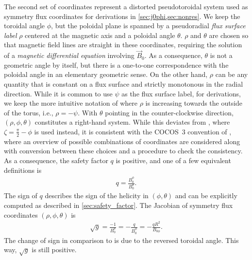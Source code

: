 The second set of coordinates represent a distorted pseudotoroidal system used as symmetry flux coordinates for derivations in \cref{sec:j0phi,sec:nonres}. We keep the toroidal angle $\phi$, but the poloidal plane is spanned by a pseudoradial \emph{flux surface label} $\rho$ centered at the magnetic axis and a poloidal angle $\theta$. $\rho$ and $\theta$ are chosen so that magnetic field lines are straight in these coordinates, requiring the solution of a \emph{magnetic differential equation} involving $\vec{B}_{0}$. As a consequence, $\theta$ is not a geometric angle by itself, but there is a one-to-one correspondence with the poloidal angle in an elementary geometric sense. On the other hand, $\rho$ can be any quantity that is constant on a flux surface and strictly monotonous in the radial direction. While it is common to use $\psi$ as the flux surface label, for derivations, we keep the more intuitive notation of \textcite{dHaeseleer91} where $\rho$ is increasing towards the outside of the torus, i.e., $\rho = -\psi$. With $\theta$ pointing in the counter-clockwise direction, $(\rho, \phi, \theta)$ constitutes a right-hand system. While this deviates from \textcite{dHaeseleer91}, where $\zeta = \frac{\pi}{2} - \phi$ is used instead, it is consistent with the COCOS~3 convention of \textcite{Sauter13}, where an overview of possible combinations of coordinates are considered along with conversion between these choices and a procedure to check the consistency. As a consequence, the safety factor $q$ is positive, and one of a few equivalent definitions is
\begin{gather}
  q = \frac{B_{0}^{\phi}}{B_{0}^{\theta}}. \label{eq:q_field_line_pitch}
\end{gather}
The sign of $q$ describes the sign of the helicity in $(\phi, \theta)$ and can be explicitly computed as described in \cref{sec:safety_factor}. The Jacobian of symmetry flux coordinates $(\rho, \phi, \theta)$ is
\begin{gather}
  \sqrt{g} = \frac{-1}{B_{0}^{\theta}} = -\frac{q}{B_{0}^{\phi}} = -\frac{q R^{2}}{B_{0 \phi}}. \label{eq:flux_metric}
\end{gather}
The change of sign in comparison to \textcite{dHaeseleer91} is due to the reversed toroidal angle. This way, $\sqrt{g}$ is still positive.

